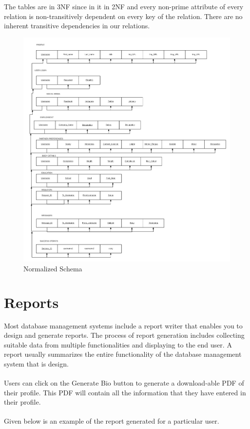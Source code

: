 \documentclass[12pt]{report}
\begin{document}
\noindent The tables are in 3NF since in it in 2NF and every non-prime attribute of every relation is non-transitively dependent on every key of the relation. There are no inherent transitive dependencies in our relations. \\
 
 
\begin{figure}[!htb]
    \centering
    \includegraphics[width=1\textwidth]{Normalized-Tables.png}
    \caption{Normalized Schema}
    \label{fig:Normalized Schema}
\end{figure}
 
\chapter{Reports} 
Most database management systems include a report
writer that enables you to design and generate reports. The process of report generation includes
collecting suitable data from multiple functionalities and displaying to the end user. A report usually
summarizes the entire functionality of the database management system that is design. \\\\
Users can click on the Generate Bio button to generate a download-able PDF of their profile. This PDF will contain all the information that they have entered in their profile. \\\\
Given below is an example of the report generated for a particular user.
\end{document}
